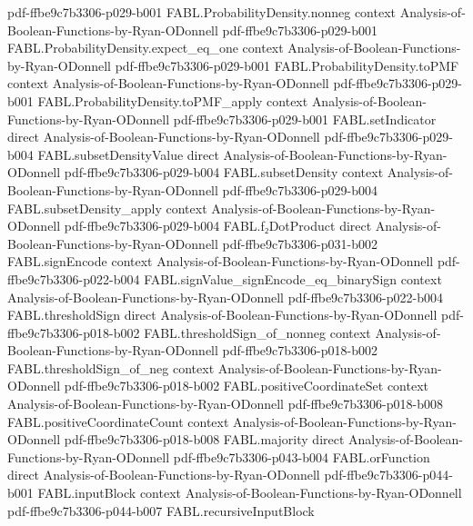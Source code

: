 \begin{theorem}
  {pdf-ffbe9c7b3306-p029-b001}
\proofstep
  {FABL.ProbabilityDensity.nonneg}
  {context}
  {Analysis-of-Boolean-Functions-by-Ryan-ODonnell}
  {pdf-ffbe9c7b3306-p029-b001}
\proofstep
  {FABL.ProbabilityDensity.expect_eq_one}
  {context}
  {Analysis-of-Boolean-Functions-by-Ryan-ODonnell}
  {pdf-ffbe9c7b3306-p029-b001}
\proofstep
  {FABL.ProbabilityDensity.toPMF}
  {context}
  {Analysis-of-Boolean-Functions-by-Ryan-ODonnell}
  {pdf-ffbe9c7b3306-p029-b001}
\proofstep
  {FABL.ProbabilityDensity.toPMF_apply}
  {context}
  {Analysis-of-Boolean-Functions-by-Ryan-ODonnell}
  {pdf-ffbe9c7b3306-p029-b001}
\proofstep
  {FABL.setIndicator}
  {direct}
  {Analysis-of-Boolean-Functions-by-Ryan-ODonnell}
  {pdf-ffbe9c7b3306-p029-b004}
\proofstep
  {FABL.subsetDensityValue}
  {direct}
  {Analysis-of-Boolean-Functions-by-Ryan-ODonnell}
  {pdf-ffbe9c7b3306-p029-b004}
\proofstep
  {FABL.subsetDensity}
  {context}
  {Analysis-of-Boolean-Functions-by-Ryan-ODonnell}
  {pdf-ffbe9c7b3306-p029-b004}
\proofstep
  {FABL.subsetDensity_apply}
  {context}
  {Analysis-of-Boolean-Functions-by-Ryan-ODonnell}
  {pdf-ffbe9c7b3306-p029-b004}
\proofstep
  {FABL.f₂DotProduct}
  {direct}
  {Analysis-of-Boolean-Functions-by-Ryan-ODonnell}
  {pdf-ffbe9c7b3306-p031-b002}
\proofstep
  {FABL.signEncode}
  {context}
  {Analysis-of-Boolean-Functions-by-Ryan-ODonnell}
  {pdf-ffbe9c7b3306-p022-b004}
\proofstep
  {FABL.signValue_signEncode_eq_binarySign}
  {context}
  {Analysis-of-Boolean-Functions-by-Ryan-ODonnell}
  {pdf-ffbe9c7b3306-p022-b004}
\proofstep
  {FABL.thresholdSign}
  {direct}
  {Analysis-of-Boolean-Functions-by-Ryan-ODonnell}
  {pdf-ffbe9c7b3306-p018-b002}
\proofstep
  {FABL.thresholdSign_of_nonneg}
  {context}
  {Analysis-of-Boolean-Functions-by-Ryan-ODonnell}
  {pdf-ffbe9c7b3306-p018-b002}
\proofstep
  {FABL.thresholdSign_of_neg}
  {context}
  {Analysis-of-Boolean-Functions-by-Ryan-ODonnell}
  {pdf-ffbe9c7b3306-p018-b002}
\proofstep
  {FABL.positiveCoordinateSet}
  {context}
  {Analysis-of-Boolean-Functions-by-Ryan-ODonnell}
  {pdf-ffbe9c7b3306-p018-b008}
\proofstep
  {FABL.positiveCoordinateCount}
  {context}
  {Analysis-of-Boolean-Functions-by-Ryan-ODonnell}
  {pdf-ffbe9c7b3306-p018-b008}
\proofstep
  {FABL.majority}
  {direct}
  {Analysis-of-Boolean-Functions-by-Ryan-ODonnell}
  {pdf-ffbe9c7b3306-p043-b004}
\proofstep
  {FABL.orFunction}
  {direct}
  {Analysis-of-Boolean-Functions-by-Ryan-ODonnell}
  {pdf-ffbe9c7b3306-p044-b001}
\proofstep
  {FABL.inputBlock}
  {context}
  {Analysis-of-Boolean-Functions-by-Ryan-ODonnell}
  {pdf-ffbe9c7b3306-p044-b007}
\proofstep
  {FABL.recursiveInputBlock}

\end{theorem}
